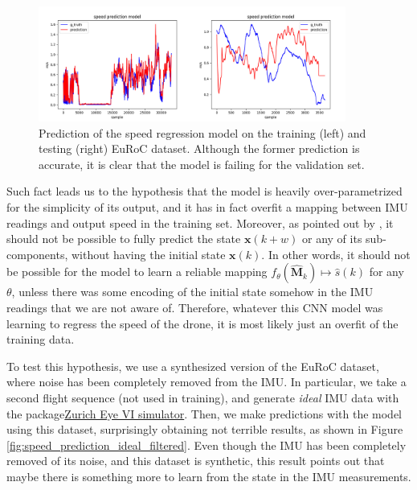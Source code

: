 \begin{figure}[h]
   \centering
   \includegraphics[width=0.90\textwidth]{thesis_template/img/speed_prediction_training_and_validation.jpg}
   \caption{Prediction of the speed regression model on the training (left) and testing (right) EuRoC dataset. Although the former prediction is accurate, it is clear that the model is failing for the validation set.}
   \label{fig:speed_prediction_train_and_val}
\end{figure}

Such fact leads us to the hypothesis that the model is heavily over-parametrized for the simplicity of its output, and it has in fact overfit a mapping between IMU readings and output speed in the training set. 
Moreover, as pointed out by \cite{DBLP:journals/corr/abs-1802-02209}, it should not be possible to fully predict the state $\mathbf{x}(k+w)$ or any of its sub-components, without having the initial state $\mathbf{x}(k)$. 
In other words, it should not be possible for the model to learn a reliable mapping $f_\theta\left(\mathbf{\hat{M}}_k\right)\mapsto\hat{s}(k)$ for any $\theta$, unless there was some encoding of the initial state somehow in the IMU readings that we are not aware of.
Therefore, whatever this CNN model was learning to regress the speed of the drone, it is most likely just an overfit of the training data.

To test this hypothesis, we use a synthesized version of the EuRoC dataset, where noise has been completely removed from the IMU.
In particular, we take a second flight sequence (not used in training), and generate \emph{ideal} IMU data with the package\href{https://github.com/zurich-eye/ze\_oss}{Zurich Eye VI simulator}.
Then, we make predictions with the model using this dataset, surprisingly obtaining not terrible results, as shown in Figure \ref{fig:speed_prediction_ideal_filtered}.
Even though the IMU has been completely removed of its noise, and this dataset is synthetic, this result points out that maybe there is something more to learn from the state in the IMU measurements.

